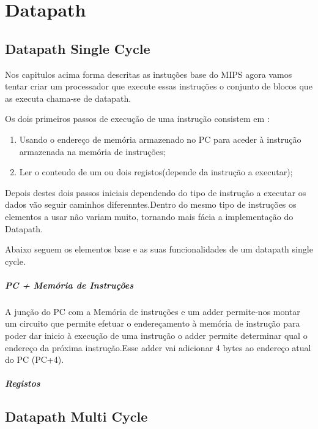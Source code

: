 \documentclass[10pt,a4paper]{book}
\begin{document}
\chapter{Datapath}

		\section{Datapath Single Cycle}

			Nos capitulos acima forma descritas as instuções base do MIPS agora vamos tentar criar um processador que execute essas instruções o conjunto de blocos que as executa chama-se de datapath.

			Os dois primeiros passos de execução de uma instrução consistem em :

			\begin{enumerate}
				\item Usando o endereço de memória armazenado no PC para aceder à instrução armazenada na memória de instruções;
				\item Ler o conteudo de um ou dois registos(depende da instrução a executar);
			\end{enumerate}

			Depois destes dois passos iniciais dependendo do tipo de instrução a executar os dados vão seguir caminhos diferenntes.Dentro do mesmo tipo de instruções os elementos a usar não variam muito, tornando mais fácia a implementação do Datapath.

			Abaixo seguem os elementos base e as suas funcionalidades de um datapath single cycle.

			\paragraph{PC + Memória de Instruções}

				A junção do PC com a Memória de instruções e um adder permite-nos montar um circuito que permite efetuar o endereçamento à memória de instrução para poder dar inicio à execução de uma instrução o adder permite determinar qual o endereço da próxima instrução.Esse adder vai adicionar 4 bytes ao endereço atual do PC (PC+4).

			\paragraph{Registos}





		\section{Datapath Multi Cycle}
\end{document}
